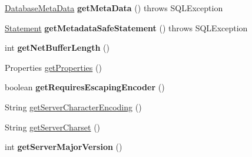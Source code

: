 \begin{DoxyCompactItemize}
\item 
\mbox{\label{classcom_1_1mysql_1_1jdbc_1_1_multi_host_my_s_q_l_connection_a33b633a88747f658f2d6e6aa0fe5eb0a}} 
\mbox{\hyperlink{classcom_1_1mysql_1_1jdbc_1_1_database_meta_data}{Database\+Meta\+Data}} {\bfseries get\+Meta\+Data} ()  throws S\+Q\+L\+Exception 
\item 
\mbox{\label{classcom_1_1mysql_1_1jdbc_1_1_multi_host_my_s_q_l_connection_a31f5e3680fd749b4172a1c227677fe52}} 
\mbox{\hyperlink{interfacecom_1_1mysql_1_1jdbc_1_1_statement}{Statement}} {\bfseries get\+Metadata\+Safe\+Statement} ()  throws S\+Q\+L\+Exception 
\item 
\mbox{\label{classcom_1_1mysql_1_1jdbc_1_1_multi_host_my_s_q_l_connection_aed88e259bf5913ade2b4ca25381b76d7}} 
int {\bfseries get\+Net\+Buffer\+Length} ()
\item 
Properties \mbox{\hyperlink{classcom_1_1mysql_1_1jdbc_1_1_multi_host_my_s_q_l_connection_a06880fce49c4791eca1bf52761c51ab4}{get\+Properties}} ()
\item 
\mbox{\label{classcom_1_1mysql_1_1jdbc_1_1_multi_host_my_s_q_l_connection_a9778dde6b59f0f293bad20a557a28fd9}} 
boolean {\bfseries get\+Requires\+Escaping\+Encoder} ()
\item 
String \mbox{\hyperlink{classcom_1_1mysql_1_1jdbc_1_1_multi_host_my_s_q_l_connection_a940e7c80b671d477225bb90a97dd0f78}{get\+Server\+Character\+Encoding}} ()
\item 
String \mbox{\hyperlink{classcom_1_1mysql_1_1jdbc_1_1_multi_host_my_s_q_l_connection_ade6eec72969b91ca518b7750d0af4539}{get\+Server\+Charset}} ()
\item 
\mbox{\label{classcom_1_1mysql_1_1jdbc_1_1_multi_host_my_s_q_l_connection_a2b10371c196a7be14febe391f0fc9ad4}} 
int {\bfseries get\+Server\+Major\+Version} ()
\item 
\mbox{\label{classcom_1_1mysql_1_1jdbc_1_1_multi_host_my_s_q_l_connection_a9a1426301ab1799001209c5ea8df232c}} 

\end{DoxyCompactItemize}
